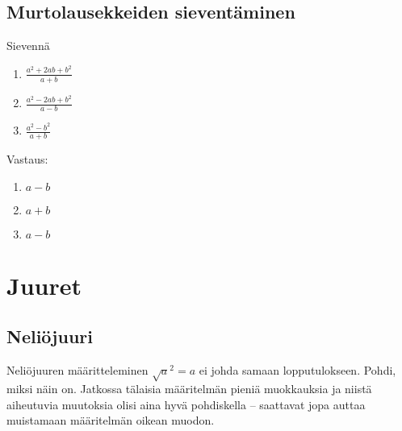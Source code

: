 \section{Murtolausekkeiden sieventäminen}

\begin{tehtava}
Sievennä
\begin{enumerate}
\item $\frac{a^2+2ab+b^2}{a+b}$
\item $\frac{a^2-2ab+b^2}{a-b}$
\item $\frac{a^2-b^2}{a+b}$
\end{enumerate}
\begin{vastaus}
Vastaus:
\begin{enumerate}
\item $a-b$
\item $a+b$
\item $a-b$
\end{enumerate}
\end{vastaus}
\end{tehtava}

\chapter{Juuret}

\section{Neliöjuuri}


Neliöjuuren määritteleminen $\sqrt{a}^2=a$ ei johda samaan lopputulokseen. Pohdi, miksi näin on.
Jatkossa tälaisia määritelmän pieniä muokkauksia ja niistä aiheutuvia muutoksia olisi aina hyvä pohdiskella -- saattavat jopa auttaa muistamaan määritelmän oikean muodon.

